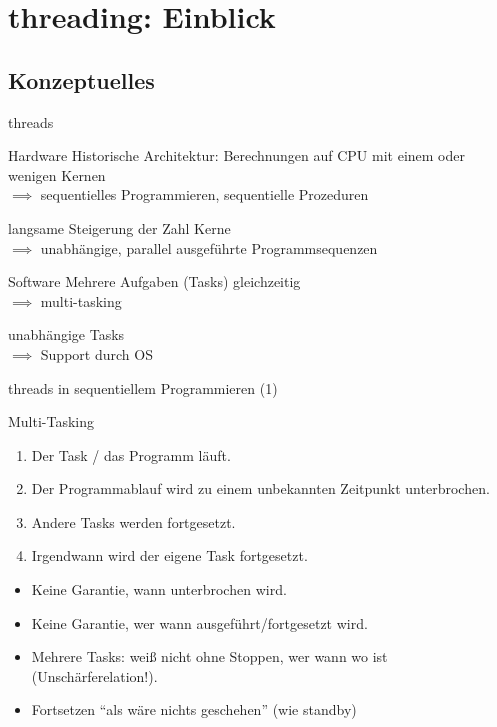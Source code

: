 \section{threading: Einblick}

\subsection{Konzeptuelles}

\begin{frame}{threads}
	\begin{block}{Hardware}
		Historische Architektur: Berechnungen auf CPU mit einem oder wenigen Kernen \\
		$\implies$ sequentielles Programmieren, sequentielle Prozeduren
		
		\vspace{1em}
		
		langsame Steigerung der Zahl Kerne \\
		$\implies$ unabhängige, parallel ausgeführte Programmsequenzen
	\end{block}
	
	\pause
	\vspace{1em}
	
	\begin{block}{Software}
		Mehrere Aufgaben (Tasks) gleichzeitig \\
		$\implies$ multi-tasking
		
		\vspace{1em}
		
		unabhängige Tasks \\
		$\implies$ Support durch OS
	\end{block}
\end{frame}

\begin{frame}{threads in sequentiellem Programmieren (1)}
	\begin{block}{Multi-Tasking}
		\begin{enumerate}
			\item Der Task / das Programm läuft.
			\item Der Programmablauf wird zu einem unbekannten Zeitpunkt unterbrochen.
			\item Andere Tasks werden fortgesetzt.
			\item Irgendwann wird der eigene Task fortgesetzt.
		\end{enumerate}
		
		\pause
		
		\begin{itemize}
			\item Keine Garantie, wann unterbrochen wird.
			\item Keine Garantie, wer wann ausgeführt/fortgesetzt wird.
			\item Mehrere Tasks: weiß nicht ohne Stoppen, wer wann wo ist (Unschärferelation!).
			\item Fortsetzen \enquote{als wäre nichts geschehen} (wie standby)
		\end{itemize}
	\end{block}
\end{frame}

